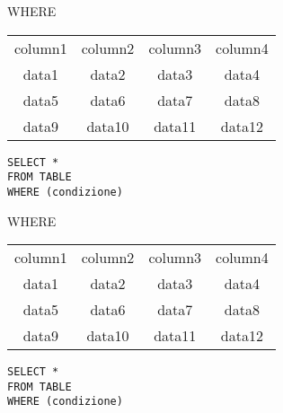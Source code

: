     \begin{frame}{WHERE}
    \begin{table}[h]
    \centering
    \begin{tabular}{|c|c|c|c|}
    \hline
    \rowcolor{cyan!30}\multicolumn{4}{|c|}{Table} \\
    \hline
    \rowcolor{cyan!30}column1 &  column2 & column3 & column4 \\
    \hline
     data1 &  data2 & data3 & data4 \\
     data5 &  data6 & data7 & data8 \\
     data9 &  data10 & data11 & data12 \\
    \hline
    \end{tabular}
    \end{table}
    \vspace{2em} 
    
    \texttt{SELECT * \\FROM TABLE\\ WHERE (condizione)}
    \end{frame}
    \begin{frame}{WHERE}
    \begin{table}[h]
    \centering
    \begin{tabular}{|c|c|c|c|}
    \hline
    \rowcolor{cyan!30}\multicolumn{4}{|c|}{Table} \\
    \hline
    \rowcolor{cyan!30}column1 &  column2 & column3 & column4 \\
    \hline
     \cellcolor{red!20}data1 &  \cellcolor{red!20}data2 & \cellcolor{red!20}data3 & \cellcolor{red!20}data4 \\
     data5 &  data6 & data7 & data8 \\
     \cellcolor{red!20}data9 &  \cellcolor{red!20}data10 & \cellcolor{red!20}data11 & \cellcolor{red!20}data12 \\
    \hline
    \end{tabular}
    \end{table}
    \vspace{2em} 
    
    \texttt{SELECT * \\FROM TABLE\\ WHERE (condizione)}
    \end{frame}
    
